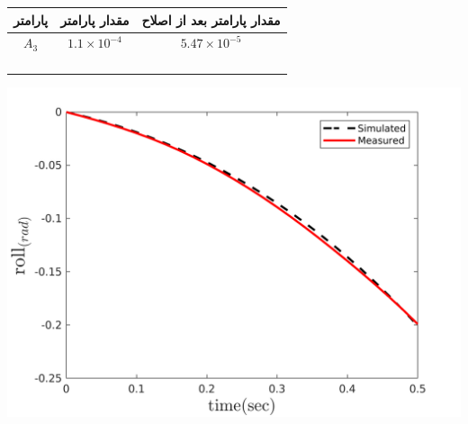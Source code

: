   \begin{minipage}[H]{\linewidth}
	\hfill
	\begin{minipage}[b]{0.49\linewidth}
		\centering
		\begin{tabular}{ccc}\hline
			پارامتر & مقدار پارامتر  & مقدار پارامتر بعد از اصلاح
			\\ \hline
			$A_3$  & $1.1\times10^{-4}$ & $5.47\times10^{-5}$ \\\\
			\\\\\\
		\end{tabular}
	\end{minipage}
	\begin{minipage}[b]{0.48\linewidth}
		\centering
		\includegraphics[width=1\linewidth]{../Figures/RCP/roll_ml_parameter_estimation/RCP_roll_S2.png}
	\end{minipage}
\end{minipage}